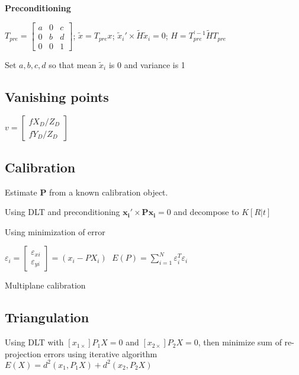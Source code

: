 \documentclass{article}
\begin{document}
\begin{multicols*}{2}
{\textbf{Preconditioning}

$T_{pre} = \left[ \begin{array}{ccc}
	a & 0 & c \\
	0 & b & d \\
	0 & 0 & 1
\end{array} \right]$;
$\tilde{x} = T_{pre}x$;
$\tilde{x}_i' \times \tilde{H} \tilde{x}_i = 0$;
$H = T_{pre}^{'-1} \tilde{H} T_{pre}$

Set $a,b,c,d$ so that mean $\tilde{x}_i$ is 0 and variance is 1

\subsection{Vanishing points}

$v = \left[ \begin{array}{c}
	f X_D / Z_D \\
	f Y_D / Z_D
\end{array} \right]$

\subsection{Calibration}

Estimate $\mathbf{P}$ from a known calibration object.

\begin{compactitem}
	\item Using DLT and preconditioning
	$\mathbf{x_i' \times P x_i} = 0$
	and decompose to  $K[R|t]$
	
	\item Using minimization of error
	
	$\varepsilon_i = \left[ \begin{array}{c}
		\varepsilon_{xi} \\ \varepsilon_{yi}
	\end{array} \right] = (x_i - PX_i)\;$
	$E(P)=\sum_{i=1}^{N}\varepsilon_i^T\varepsilon_i$
	
	\item Multiplane calibration
\end{compactitem}

\subsection{Triangulation}

Using DLT with $[x_{1 \times}]P_1X=0$ and $[x_{2 \times}]P_2X=0$,
then minimize sum of re-projection errors using iterative algorithm
$E(X) = d^2(x_1,P_1X) + d^2(x_2,P_2X)$

}
\end{multicols*}
\end{document}
